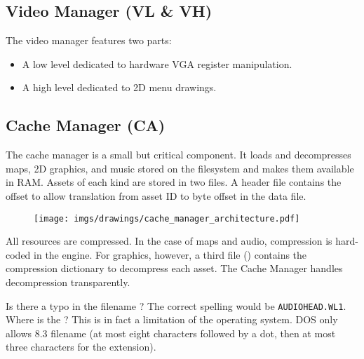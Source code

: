 \documentclass[book.tex]{subfiles}
\begin{document}
\subsection{Video Manager (VL \& VH)}
The video manager features two parts:
\begin{itemize}
\item A low level dedicated to hardware VGA register manipulation.
\item A high level dedicated to 2D menu drawings.
\end{itemize}
\par






\subsection{Cache Manager (CA)}
The cache manager is a small but critical component. It loads and decompresses maps, 2D graphics, and music stored on the filesystem and makes them available in RAM. Assets of each kind are stored in two files. A header file contains the offset to allow translation from asset ID to byte offset in the data file.\\
 \par
\begin{figure}[H]
\centering
 \texttt{[image: imgs/drawings/cache\_manager\_architecture.pdf]}
 \end{figure}
 \par
{} All resources are compressed. In the case of maps and audio, compression is hard-coded in the engine. For graphics, however, a third file () contains the compression dictionary to decompress each asset. The Cache Manager handles decompression transparently.\\
\par
{} Is there a typo in the filename  ? The correct spelling would be \texttt{\justify AUDIOHEAD.WL1}. Where is the ? This is in fact a limitation of the operating system. DOS only allows 8.3 filename (at most eight characters followed by a dot, then at most three characters for the extension).
\end{document}
